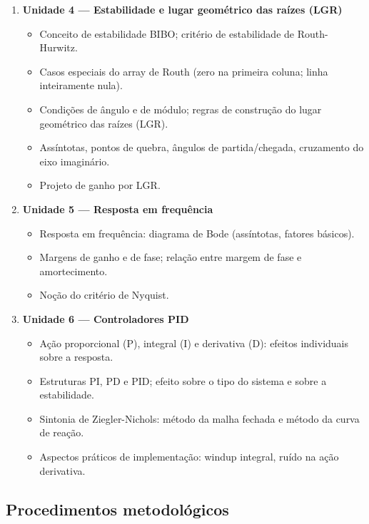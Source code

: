 \documentclass[oneside,a4paper,12pt]{article}
\begin{document}
\begin{enumerate}
    \item \textbf{Unidade 4 --- Estabilidade e lugar geométrico das raízes (LGR)}
    \begin{itemize}
      \item Conceito de estabilidade BIBO; critério de estabilidade de Routh-Hurwitz.
      \item Casos especiais do array de Routh (zero na primeira coluna; linha inteiramente nula).
      \item Condições de ângulo e de módulo; regras de construção do lugar geométrico das raízes (LGR).
      \item Assíntotas, pontos de quebra, ângulos de partida/chegada, cruzamento do eixo imaginário.
      \item Projeto de ganho por LGR.
    \end{itemize}

    \item \textbf{Unidade 5 --- Resposta em frequência}
    \begin{itemize}
      \item Resposta em frequência: diagrama de Bode (assíntotas, fatores básicos).
      \item Margens de ganho e de fase; relação entre margem de fase e amortecimento.
      \item Noção do critério de Nyquist.
    \end{itemize}

    \item \textbf{Unidade 6 --- Controladores PID}
    \begin{itemize}
      \item Ação proporcional (P), integral (I) e derivativa (D): efeitos individuais sobre a resposta.
      \item Estruturas PI, PD e PID; efeito sobre o tipo do sistema e sobre a estabilidade.
      \item Sintonia de Ziegler-Nichols: método da malha fechada e método da curva de reação.
      \item Aspectos práticos de implementação: windup integral, ruído na ação derivativa.
    \end{itemize}
  \end{enumerate}



  \begin{snugshade}
  \section{Procedimentos metodológicos} %
  \end{snugshade}
\end{document}
